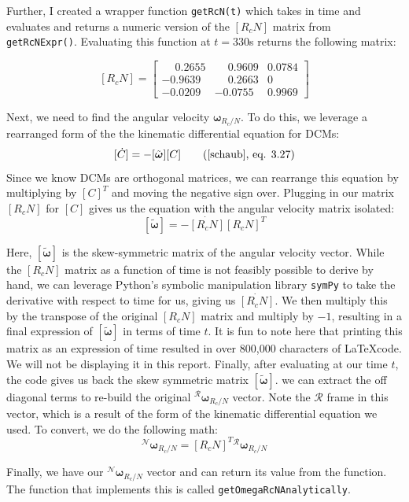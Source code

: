 \documentclass[conf]{new-aiaa}
\begin{document}
Further, I created a wrapper function \texttt{getRcN(t)} which takes in time and evaluates and returns a numeric version of the $[R_cN]$ matrix from \texttt{getRcNExpr()}. Evaluating this function at $t=330$s returns the following matrix:

\[
[R_cN] =
\begin{bmatrix}
\phantom{-}0.2655 & \phantom{-}0.9609 & 0.0784 \\
-0.9639 & \phantom{-}0.2663 & 0 \\
-0.0209 & -0.0755 & 0.9969
\end{bmatrix}
\]

Next, we need to find the angular velocity $\bm{\omega}_{R_c/N}$. To do this, we leverage a rearranged form of the the kinematic differential equation for DCMs:
\[
[\dot C] = -[\tilde{\bm\omega}][C] \tag{\cite{schaub},~eq. 3.27}
\]
Since we know DCMs are orthogonal matrices, we can rearrange this equation by multiplying by $[C]^T$ and moving the negative sign over. Plugging in our matrix $[R_cN]$ for $[C]$ gives us the equation with the angular velocity matrix isolated:
\[
[\tilde{\bm{\omega}}] = -\dot{[R_cN]}[R_cN]^T
\]

Here, $[\tilde{\bm{\omega}}]$ is the skew-symmetric matrix of the angular velocity vector. While the $[R_cN]$ matrix as a function of time is not feasibly possible to derive by hand, we can leverage Python's symbolic manipulation library \texttt{symPy} to take the derivative with respect to time for us, giving us $\dot{[R_cN]}$. We then multiply this by the transpose of the original $[R_cN]$ matrix and multiply by $-1$, resulting in a final expression of $[\tilde{\bm{\omega}}]$ in terms of time $t$. It is fun to note here that printing this matrix as an expression of time resulted in over 800,000 characters of \LaTeX code. We will not be displaying it in this report. Finally, after evaluating at our time $t$, the code gives us back the skew symmetric matrix $[\tilde{\bm\omega}]$. we can extract the off diagonal terms to re-build the original ${}^{\mathcal{R}}\bm{\omega}_{R_c/N}$ vector. Note the $\mathcal{R}$ frame in this vector, which is a result of the form of the kinematic differential equation we used. To convert, we do the following math:
\[
{}^{\mathcal{N}}\bm{\omega}_{R_c/N} = [R_cN]^T{}^{\mathcal{R}}\bm{\omega}_{R_c/N}
\]

Finally, we have our ${}^{\mathcal{N}}\bm{\omega}_{R_c/N}$ vector and can return its value from the function. The function that implements this is called \texttt{getOmegaRcNAnalytically}.
\end{document}

